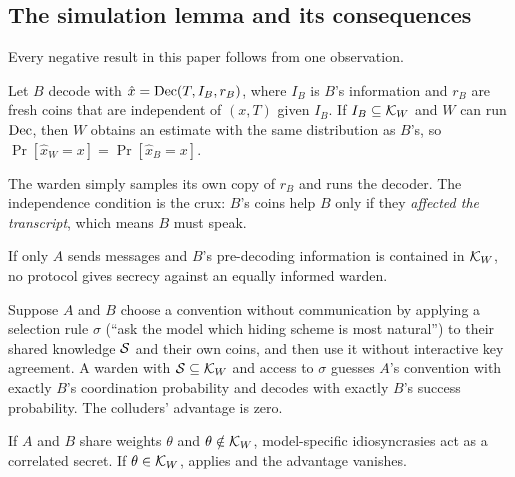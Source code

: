 

\subsection{The simulation lemma and its consequences}

Every negative result in this paper follows from one observation.

\begin{lemma}
\label{lem:sim}
Let $B$ decode with $\hat{x} = \mathrm{Dec}(T, I_B, r_B)$, where $I_B$ is $B$'s information and $r_B$ are fresh coins that are independent of $(x, T)$ given $I_B$. If $I_B \subseteq \mathcal{K}_W$ and $W$ can run $\mathrm{Dec}$, then $W$ obtains an estimate with the same distribution as $B$'s, so $\Pr[\hat{x}_W = x] = \Pr[\hat{x}_B = x]$.
\end{lemma}

The warden simply samples its own copy of $r_B$ and runs the decoder. The independence condition is the crux: $B$'s coins help $B$ only if they \emph{affected the transcript}, which means $B$ must speak.

\begin{corollary}
\label{cor:oneway}
If only $A$ sends messages and $B$'s pre-decoding information is contained in $\mathcal{K}_W$, no protocol gives secrecy against an equally informed warden.
\end{corollary}

\begin{corollary}
\label{cor:schelling}
Suppose $A$ and $B$ choose a convention without communication by applying a selection rule $\sigma$ (\eg ``ask the model which hiding scheme is most natural'') to their shared knowledge $\mathcal{S}$ and their own coins, and then use it without interactive key agreement. A warden with $\mathcal{S} \subseteq \mathcal{K}_W$ and access to $\sigma$ guesses $A$'s convention with exactly $B$'s coordination probability and decodes with exactly $B$'s success probability. The colluders' advantage is zero.
\end{corollary}

\begin{corollary}
\label{cor:weights}
If $A$ and $B$ share weights $\theta$ and $\theta \notin \mathcal{K}_W$, model-specific idiosyncrasies act as a correlated secret. If $\theta \in \mathcal{K}_W$,  applies and the advantage vanishes.
\end{corollary}

